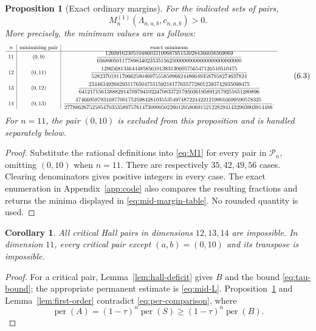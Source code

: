 \documentclass[11pt]{article}
\newtheorem{proposition}[theorem]{Proposition}
\newtheorem{corollary}[theorem]{Corollary}
\theoremstyle{definition}
\newcommand{\per}{\operatorname{per}}
\newcommand{\1}{\mathbf{1}}
\begin{document}
\begin{proposition}[Exact ordinary margins]\label{prop:mid-margins}
For the indicated sets of pairs,
\[
 M_n^{(1)}(\Lambda_{n,a,b},c_{n,a,b})>0.
\]
More precisely, the minimum values are as follows:
\begin{equation}\label{eq:mid-margin-table}
\resizebox{0.98\textwidth}{!}{$%
\begin{array}{c|c|c}
 n&\text{minimizing pair}&\text{exact minimum}\\ \hline
 11&(0,9)&
 \dfrac{1260916230510486033100687951530284366056569069}
 {6568905011778983402353515625000000000000000000000000}\\[4mm]
 12&(0,11)&
 \dfrac{1296568134644485856101383130605756547126510510475}
 {52823701911706625804697555859966244866493587958274637824}\\[4mm]
 13&(0,12)&
 \dfrac{2344634926829311765047551592181776557728012393742935099475}
 {64121715613888291470979410224708337217950361958912179251651280896}\\[4mm]
 14&(0,13)&
 \dfrac{4746695979316977001752598428103553549748722442212199016699590578325}
 {277886267525954703535897576147309905022601205806915212282941432903903914488}.
\end{array}
$}
\tag{6.3}
\end{equation}
For $n=11$, the pair $(0,10)$ is excluded from this proposition and is handled separately below.
\end{proposition}

\begin{proof}
Substitute the rational definitions into \eqref{eq:M1} for every pair in $\mathcal P_n$, omitting $(0,10)$ when $n=11$.  There are respectively $35,42,49,56$ cases.  Clearing denominators gives positive integers in every case.  The exact enumeration in Appendix~\ref{app:code} also compares the resulting fractions and returns the minima displayed in \eqref{eq:mid-margin-table}.  No rounded quantity is used.
\end{proof}

\begin{corollary}\label{cor:ordinary-excluded}
All critical Hall pairs in dimensions $12,13,14$ are impossible.  In dimension $11$, every critical pair except $(a,b)=(0,10)$ and its transpose is impossible.
\end{corollary}

\begin{proof}
For a critical pair, Lemma~\ref{lem:hall-deficit} gives $B$ and the bound \eqref{eq:tau-bound}; the appropriate permanent estimate is \eqref{eq:mid-L}.  Proposition~\ref{prop:mid-margins} and Lemma~\ref{lem:first-order} contradict \eqref{eq:per-comparison}, where
\[
 \per(A)=(1-\tau)^n\per(S)
 \ge(1-\tau)^n\per(B).
 \tag{6.4}\label{eq:per-comparison}
\]
\end{proof}
\end{document}
